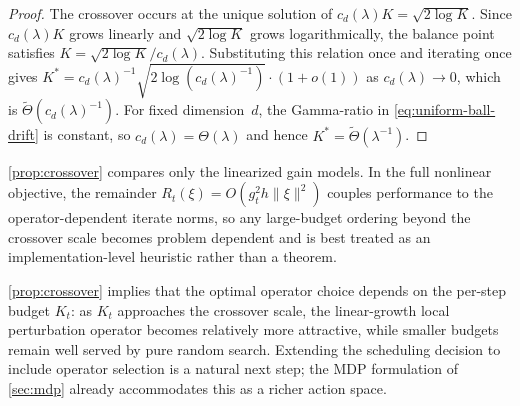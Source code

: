 \begin{proof}
The crossover occurs at the unique solution of
$c_d(\lambda)K=\sqrt{2\log K}$.
Since $c_d(\lambda)K$ grows linearly and $\sqrt{2\log K}$
grows logarithmically, the balance point satisfies
$K=\sqrt{2\log K}/c_d(\lambda)$.
Substituting this relation once and
iterating once gives
$K^*=c_d(\lambda)^{-1}\sqrt{2\log(c_d(\lambda)^{-1})}\cdot(1+o(1))$
as $c_d(\lambda)\to 0$, which is
$\tilde{\Theta}(c_d(\lambda)^{-1})$.
For fixed dimension~$d$, the Gamma-ratio in
\eqref{eq:uniform-ball-drift} is constant, so
$c_d(\lambda)=\Theta(\lambda)$ and hence
$K^*=\tilde{\Theta}(\lambda^{-1})$.
\end{proof}

\begin{remark}
\label{rmk:crossover-full}
\cref{prop:crossover} compares only the linearized gain models.
In the full nonlinear objective, the remainder
$R_t(\xi)=O(g_t^2 h\|\xi\|^2)$ couples performance to the
operator-dependent iterate norms, so any large-budget ordering beyond
the crossover scale becomes problem dependent and is best treated as an
implementation-level heuristic rather than a theorem.
\end{remark}

\begin{remark}
\label{rmk:operator-selection}
\cref{prop:crossover} implies that the optimal operator choice
depends on the per-step budget $K_t$: as $K_t$ approaches the crossover
scale, the linear-growth local perturbation operator becomes relatively
more attractive, while smaller budgets remain well served by pure random
search.
Extending the scheduling decision to include operator selection is a
natural next step; the MDP formulation of \cref{sec:mdp} already
accommodates this as a richer action space.
\end{remark}
